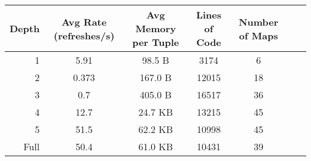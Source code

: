 \begin{tabular}{|r|c|c|c|c|c|c|}\hline
{\bf Depth} & Avg Rate (refreshes/s) & Avg Memory per Tuple & Lines of Code & Number of Maps\\ \hline
1 & 5.91 & 98.5 B & 3174 &        6 \\ \hline 
2 & 0.373 & 167.0 B & 12015 &       18 \\ \hline 
3 & 0.7 & 405.0 B & 16517 &       36 \\ \hline 
4 & 12.7 & 24.7 KB & 13215 &       45 \\ \hline 
5 & 51.5 & 62.2 KB & 10998 &       45 \\ \hline 
Full & 50.4 & 61.0 KB & 10431 &       39 \\ \hline 
\end{tabular}